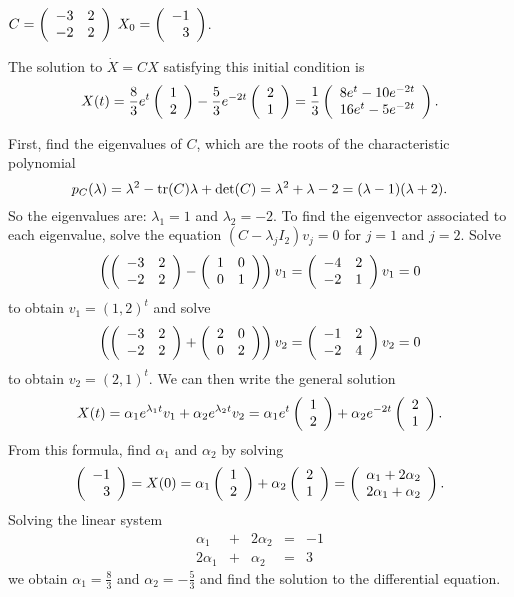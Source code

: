 \documentclass{ximera}
\begin{document}
\begin{exercise}  \label{c4.10A.1c}
$C = \left(\begin{array}{rr} -3 & 2\\ -2 &2\end{array}\right)$ \AND $X_0 = \left(\begin{array}{r} -1 \\ 3\end{array}\right)$.

\begin{solution}
\ans The solution to $\dot{X} = CX$ satisfying this
initial condition is
\[
X(t) = \frac{8}{3}e^t\left(\begin{array}{r} 1 \\ 2\end{array}\right) - \frac{5}{3}e^{-2t}\left(\begin{array}{r} 2 \\ 1\end{array}\right)
= \frac{1}{3}\left(\begin{array}{c} 8e^t - 10e^{-2t} \\ 16e^t - 5e^{-2t}\end{array}\right).
\]

\soln First, find the eigenvalues of $C$, which are the roots of the
characteristic polynomial
\[
p_C(\lambda) = \lambda^2 - {\rm tr}(C)\lambda + \det(C) =
\lambda^2 + \lambda - 2 = (\lambda - 1)(\lambda + 2).
\]
So the eigenvalues are: $\lambda_1 = 1$ and $\lambda_2 = -2$.
To find the eigenvector associated to each eigenvalue, solve
the equation $(C - \lambda_jI_2)v_j = 0$ for $j = 1$ and $j = 2$.  Solve
\[
\left(\left(\begin{array}{rr} -3 & 2\\ -2 &2\end{array}\right) - \left(\begin{array}{rr} 1 & 0\\ 0 &1\end{array}\right)\right)v_1 =
\left(\begin{array}{rr} -4 & 2\\ -2 &1\end{array}\right)v_1 = 0
\]
to obtain $v_1 = (1,2)^t$ and solve
\[
\left(\left(\begin{array}{rr} -3 & 2\\ -2 &2\end{array}\right) + \left(\begin{array}{rr} 2 & 0\\ 0 &2\end{array}\right)\right)v_2 =
\left(\begin{array}{rr} -1 & 2\\ -2 &4\end{array}\right)v_2 = 0
\]
to obtain $v_2 = (2,1)^t$.  We can then write the general solution
\[
X(t) = \alpha_1e^{\lambda_1 t}v_1 + \alpha_2e^{\lambda_2 t}v_2
= \alpha_1e^t\left(\begin{array}{r} 1 \\ 2\end{array}\right) + \alpha_2e^{-2t}\left(\begin{array}{r} 2 \\ 1\end{array}\right).
\]
From this formula, find $\alpha_1$ and $\alpha_2$ by solving
\[
\left(\begin{array}{r} -1 \\ 3\end{array}\right) = X(0) = \alpha_1\left(\begin{array}{r} 1 \\ 2\end{array}\right) + \alpha_2\left(\begin{array}{r} 2 \\ 1\end{array}\right) =
\left(\begin{array}{c} \alpha_1 + 2\alpha_2 \\ 2\alpha_1 + \alpha_2\end{array}\right).
\]
Solving the linear system
\[
\begin{array}{rrrrr}
\alpha_1 & + & 2\alpha_2 & = & -1 \\
2\alpha_1 & + & \alpha_2 & = & 3
\end{array}
\]
we obtain $\alpha_1 = \frac{8}{3}$ and $\alpha_2 = -\frac{5}{3}$
and find the solution to the differential equation.


\end{solution}
\end{exercise}
\end{document}
